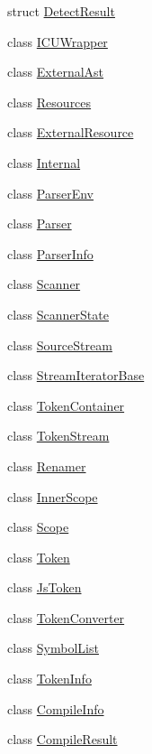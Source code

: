 \begin{DoxyCompactItemize}
struct \hyperlink{structmocha_1_1_detect_result}{DetectResult}
\item 
class \hyperlink{classmocha_1_1_i_c_u_wrapper}{ICUWrapper}
\item 
class \hyperlink{classmocha_1_1_external_ast}{ExternalAst}
\item 
class \hyperlink{classmocha_1_1_resources}{Resources}
\item 
class \hyperlink{classmocha_1_1_external_resource}{ExternalResource}
\item 
class \hyperlink{classmocha_1_1_internal}{Internal}
\item 
class \hyperlink{classmocha_1_1_parser_env}{ParserEnv}
\item 
class \hyperlink{classmocha_1_1_parser}{Parser}
\item 
class \hyperlink{classmocha_1_1_parser_info}{ParserInfo}
\item 
class \hyperlink{classmocha_1_1_scanner}{Scanner}
\item 
class \hyperlink{classmocha_1_1_scanner_state}{ScannerState}
\item 
class \hyperlink{classmocha_1_1_source_stream}{SourceStream}
\item 
class \hyperlink{classmocha_1_1_stream_iterator_base}{StreamIteratorBase}
\item 
class \hyperlink{classmocha_1_1_token_container}{TokenContainer}
\item 
class \hyperlink{classmocha_1_1_token_stream}{TokenStream}
\item 
class \hyperlink{classmocha_1_1_renamer}{Renamer}
\item 
class \hyperlink{classmocha_1_1_inner_scope}{InnerScope}
\item 
class \hyperlink{classmocha_1_1_scope}{Scope}
\item 
class \hyperlink{classmocha_1_1_token}{Token}
\item 
class \hyperlink{classmocha_1_1_js_token}{JsToken}
\item 
class \hyperlink{classmocha_1_1_token_converter}{TokenConverter}
\item 
class \hyperlink{classmocha_1_1_symbol_list}{SymbolList}
\item 
class \hyperlink{classmocha_1_1_token_info}{TokenInfo}
\item 
class \hyperlink{classmocha_1_1_compile_info}{CompileInfo}
\item 
class \hyperlink{classmocha_1_1_compile_result}{CompileResult}
\item 

\end{DoxyCompactItemize}
